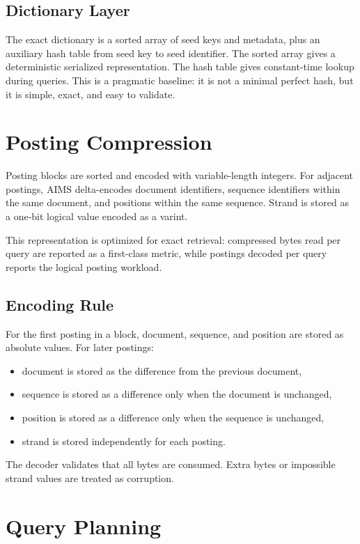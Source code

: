 \documentclass[11pt]{article}
\begin{document}
\subsection{Dictionary Layer}

The exact dictionary is a sorted array of seed keys and metadata, plus an auxiliary hash table from seed key to seed identifier. The sorted array gives a deterministic serialized representation. The hash table gives constant-time lookup during queries. This is a pragmatic baseline: it is not a minimal perfect hash, but it is simple, exact, and easy to validate.

\section{Posting Compression}

Posting blocks are sorted and encoded with variable-length integers. For adjacent postings, AIMS delta-encodes document identifiers, sequence identifiers within the same document, and positions within the same sequence. Strand is stored as a one-bit logical value encoded as a varint.

This representation is optimized for exact retrieval: compressed bytes read per query are reported as a first-class metric, while postings decoded per query reports the logical posting workload.

\subsection{Encoding Rule}

For the first posting in a block, document, sequence, and position are stored as absolute values. For later postings:
\begin{itemize}
  \item document is stored as the difference from the previous document,
  \item sequence is stored as a difference only when the document is unchanged,
  \item position is stored as a difference only when the sequence is unchanged,
  \item strand is stored independently for each posting.
\end{itemize}

The decoder validates that all bytes are consumed. Extra bytes or impossible strand values are treated as corruption.

\section{Query Planning}
\end{document}
